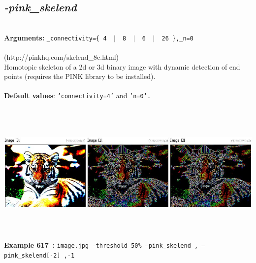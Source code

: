 \documentclass[a4paper,11pt,twoside]{book}
\begin{document}
\subsection{\emph{-pink\_skelend} }\vspace*{-0.5em}
~\\\textbf{Arguments: } 
{\small \texttt{\_connectivity=\{ 4 ~$|$~ 8 ~$|$~ 6 ~$|$~ 26 \},\_n=0}}\\~\\
(http://pinkhq.com/skelend\_8c.html)
~\\Homotopic skeleton of a 2d or 3d binary image with dynamic detection of end points (requires the PINK library to be installed).
~\\~\\\textbf{Default values}: {\small \texttt{'connectivity=4'} and \texttt{'n=0'.}}
\begin{center}\includegraphics[keepaspectratio=true,height=7cm,width=\textwidth]{img/gmic_def617.jpg}\\
{\footnotesize \textbf{Example 617~:} \texttt{image.jpg -threshold 50\% --pink\_skelend , --pink\_skelend[-2] ,-1}}
\end{center}
\end{document}
